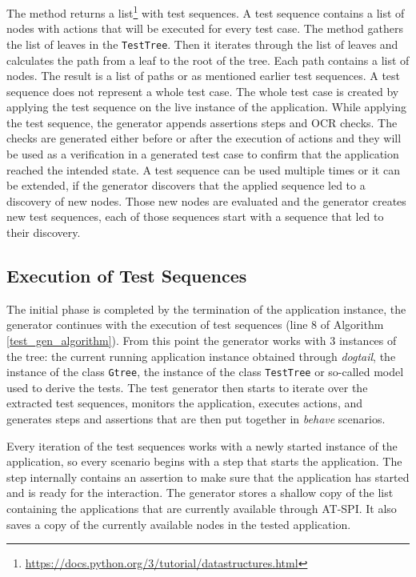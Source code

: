 The method returns a list\footnote{\url{https://docs.python.org/3/tutorial/datastructures.html}} with test sequences. A test sequence contains a list of nodes with actions that will be executed for every test case. The method gathers the list of leaves in the \texttt{TestTree}. Then it iterates through the list of leaves and calculates the path from a leaf to the root of the tree. Each path contains a list of nodes. The result is a list of paths or as mentioned earlier test sequences. A test sequence does not represent a whole test case. The whole test case is created by applying the test sequence on the live instance of the application. While applying the test sequence, the generator appends assertions steps and OCR checks. The checks are generated either before or after the execution of actions and they will be used as a verification in a generated test case to confirm that the application reached the intended state. A test sequence can be used multiple times or it can be extended, if the generator discovers that the applied sequence led to a discovery of new nodes. Those new nodes are evaluated and the generator creates new test sequences, each of those sequences start with a sequence that led to their discovery. 

\subsection{Execution of Test Sequences}
The initial phase is completed by the termination of the application instance, the generator continues with the execution of test sequences (line 8 of Algorithm \ref{test_gen_algorithm}). From this point the generator works with 3 instances of the tree: the current running application instance obtained through \textit{dogtail}, the instance of the class \texttt{Gtree}, the instance of the class \texttt{TestTree} or so-called model used to derive the tests.
The test generator then starts to iterate over the extracted test sequences, monitors the application, executes actions, and generates steps and assertions that are then put together in \textit{behave} scenarios. 

Every iteration of the test sequences works with a newly started instance of the application, so every scenario begins with a step that starts the application. The step internally contains an assertion to make sure that the application has started and is ready for the interaction. The generator stores a shallow copy of the list containing the applications that are currently available through AT-SPI. It also saves a copy of the currently available nodes in the tested application. 

